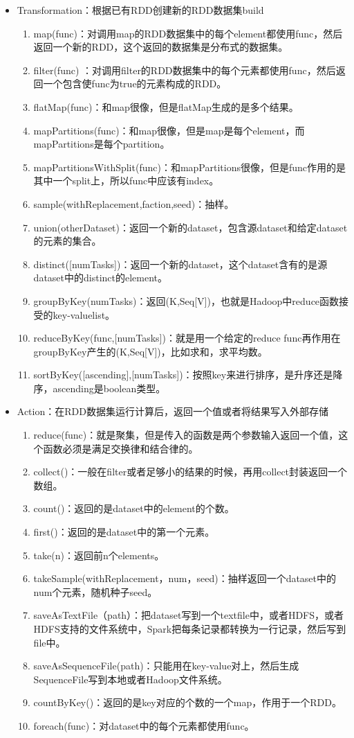 \documentclass[UTF8]{report}
\begin{document}
\begin{itemize}
    \item Transformation：根据已有RDD创建新的RDD数据集build

\begin{enumerate}[1)]
\item map(func)：对调用map的RDD数据集中的每个element都使用func，然后返回一个新的RDD，这个返回的数据集是分布式的数据集。
\item filter(func) ：对调用filter的RDD数据集中的每个元素都使用func，然后返回一个包含使func为true的元素构成的RDD。
\item flatMap(func)：和map很像，但是flatMap生成的是多个结果。
\item mapPartitions(func)：和map很像，但是map是每个element，而mapPartitions是每个partition。
\item mapPartitionsWithSplit(func)：和mapPartitions很像，但是func作用的是其中一个split上，所以func中应该有index。
\item sample(withReplacement,faction,seed)：抽样。
\item union(otherDataset)：返回一个新的dataset，包含源dataset和给定dataset的元素的集合。
\item distinct([numTasks])：返回一个新的dataset，这个dataset含有的是源dataset中的distinct的element。
\item groupByKey(numTasks)：返回(K,Seq[V])，也就是Hadoop中reduce函数接受的key-valuelist。
\item reduceByKey(func,[numTasks])：就是用一个给定的reduce func再作用在groupByKey产生的(K,Seq[V])，比如求和，求平均数。
\item sortByKey([ascending],[numTasks])：按照key来进行排序，是升序还是降序，ascending是boolean类型。
\end{enumerate}
\item  Action：在RDD数据集运行计算后，返回一个值或者将结果写入外部存储
\begin{enumerate}[1)]
\item reduce(func)：就是聚集，但是传入的函数是两个参数输入返回一个值，这个函数必须是满足交换律和结合律的。
\item collect()：一般在filter或者足够小的结果的时候，再用collect封装返回一个数组。
\item count()：返回的是dataset中的element的个数。
\item first()：返回的是dataset中的第一个元素。
\item take(n)：返回前n个elements。
\item takeSample(withReplacement，num，seed)：抽样返回一个dataset中的num个元素，随机种子seed。
\item saveAsTextFile（path）：把dataset写到一个textfile中，或者HDFS，或者HDFS支持的文件系统中，Spark把每条记录都转换为一行记录，然后写到file中。
\item saveAsSequenceFile(path)：只能用在key-value对上，然后生成SequenceFile写到本地或者Hadoop文件系统。
\item countByKey()：返回的是key对应的个数的一个map，作用于一个RDD。
\item foreach(func)：对dataset中的每个元素都使用func。
\end{enumerate}
\end{itemize}
\end{document}
